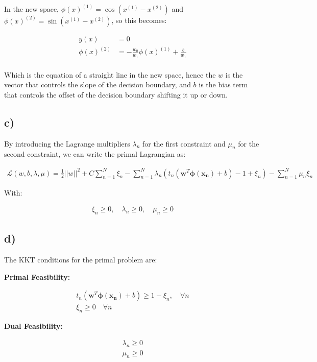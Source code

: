 \documentclass[12pt,a4paper,oneside]{paper}
\begin{document}
In the new space, $\phi(x)^{(1)} = \cos(x^{(1)} - x^{(2)})$ and $\phi(x)^{(2)} = \sin(x^{(1)} - x^{(2)})$, so this becomes:

\begin{align*}
    y(x) &= 0 \\
    \phi(x)^{(2)} &= -\frac{w_0}{w_1} \phi(x)^{(1)} + \frac{b}{w_1} \\
\end{align*}

Which is the equation of a straight line in the new space, hence the $w$ is the vector that controls the slope
of the decision boundary, and $b$ is the bias term that controls the offset of the decision boundary shifting it
up or down.

\newpage
\subsection*{c)}

By introducing the Lagrange multipliers $\lambda_n$ for the first constraint and $\mu_n$ for the second constraint, we can write the primal Lagrangian as:

\begin{align*}
    \mathcal{L} (w, b, \lambda, \mu) = \frac{1}{2} ||w||^2 + C \sum_{n=1}^{N} \xi_n - \sum_{n=1}^{N} \lambda_n \left( t_n (\bm{w}^T \bm{\phi(x_n)} + b) - 1 + \xi_n \right) - \sum_{n=1}^{N} \mu_n \xi_n
\end{align*}

With:

\begin{align*}
    \xi_n \geq 0, \quad \lambda_n \geq 0, \quad \mu_n \geq 0
\end{align*}

\newpage
\subsection*{d)}

The KKT conditions for the primal problem are:

\textbf{Primal Feasibility:}

\begin{align*}
    t_n (\bm{w}^T \bm{\phi(x_n)} + b) \geq 1 - \xi_n, \quad \forall n \\
    \xi_n \geq 0 \quad \forall n
\end{align*}

\textbf{Dual Feasibility:}

\begin{align*}
    \lambda_n \geq 0 \\
     \mu_n \geq 0
\end{align*}
\end{document}
